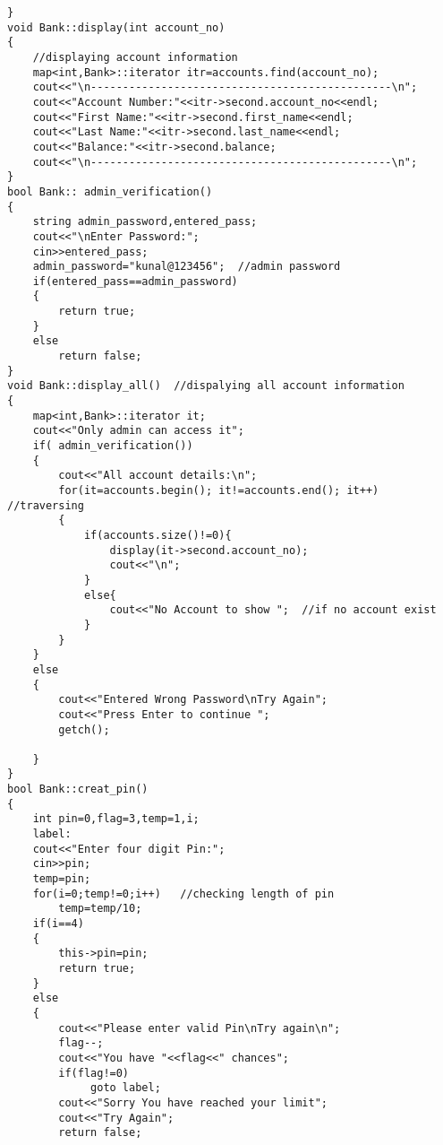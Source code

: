\documentclass[11pt, a4paper]{article}
\begin{document}
\begin{lstlisting}
}
void Bank::display(int account_no)
{
    //displaying account information
    map<int,Bank>::iterator itr=accounts.find(account_no);
    cout<<"\n-----------------------------------------------\n";
    cout<<"Account Number:"<<itr->second.account_no<<endl;
    cout<<"First Name:"<<itr->second.first_name<<endl;
    cout<<"Last Name:"<<itr->second.last_name<<endl;
    cout<<"Balance:"<<itr->second.balance;
    cout<<"\n-----------------------------------------------\n";
}
bool Bank:: admin_verification()  
{
    string admin_password,entered_pass;
    cout<<"\nEnter Password:";
    cin>>entered_pass;
    admin_password="kunal@123456";  //admin password
    if(entered_pass==admin_password)
    {
        return true;
    }
    else
        return false;
}
void Bank::display_all()  //dispalying all account information 
{
    map<int,Bank>::iterator it;
    cout<<"Only admin can access it";
    if( admin_verification())
    {
        cout<<"All account details:\n";
        for(it=accounts.begin(); it!=accounts.end(); it++) //traversing 
        {
            if(accounts.size()!=0){
                display(it->second.account_no);
                cout<<"\n";
            }
            else{
                cout<<"No Account to show ";  //if no account exist
            }
        }
    }
    else
    {
        cout<<"Entered Wrong Password\nTry Again";
        cout<<"Press Enter to continue ";
        getch();

    }
}
bool Bank::creat_pin()
{
    int pin=0,flag=3,temp=1,i;
    label:
    cout<<"Enter four digit Pin:";
    cin>>pin;
    temp=pin;
    for(i=0;temp!=0;i++)   //checking length of pin 
        temp=temp/10;
    if(i==4)
    {
        this->pin=pin;
        return true;
    }
    else
    {
        cout<<"Please enter valid Pin\nTry again\n";
        flag--;
        cout<<"You have "<<flag<<" chances";
        if(flag!=0)
             goto label;
        cout<<"Sorry You have reached your limit";
        cout<<"Try Again";
        return false;


\end{lstlisting}
\end{document}
